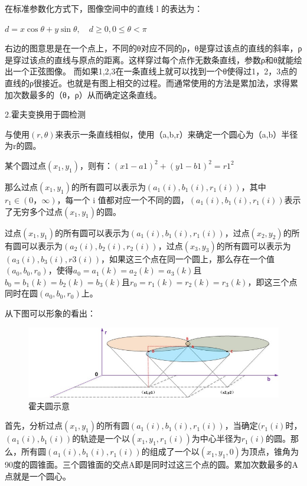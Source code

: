 在标准参数化方式下，图像空间中的直线 l 的表达为：

$d=x \cos \theta+y \sin \theta, \quad d \geqslant 0,0 \leqslant \theta<\pi$

右边的图意思是在一个点上，不同的θ对应不同的ρ，θ是穿过该点的直线的斜率，ρ是穿过该点的直线与原点的距离。这样穿过每个点作无数条直线，参数ρ和θ就能绘出一个正弦图像。 ⽽如果1,2,3在一条直线上就可以找到⼀个θ使得过1，2，3点的直线的ρ很接近。也就是有图上相交的过程。而通常使用的方法是累加法，求得累加次数最多的（θ，ρ）从⽽确定这条直线。

2.霍夫变换用于圆检测

与使用$(r, \theta)$来表示一条直线相似，使用（a,b,r）来确定一个圆心为（a,b）半径为r的圆。

某个圆过点$(x_{1}, y_{1})$，则有：$(x1-a1)^2 + (y1-b1)^2 = r1^2$

那么过点$(x_{1}, y_{1})$的所有圆可以表示为$(a_{1}(i), b_{1}(i), r_{1}(i))$，其中$r_{1} \in (0，\infty)$，每⼀个 i 值都对应⼀个不同的圆，$(a_{1}(i), b_{1}(i), r_{1}(i))$表示了无穷多个过点$(x_{1}, y_{1})$的圆。

过点$(x_{1}, y_{1})$的所有圆可以表示为$(a_{1}(i), b_{1}(i),r_{1}(i))$，过点$(x_{2}, y_{2})$的所有圆可以表示为$(a_{2}(i),b_{2}(i),r_{2}(i))$，过点$(x_{3}, y_{3})$的所有圆可以表示为$(a_{3}(i),b_{3}(i),r3(i))$，如果这三个点在同一个圆上，那么存在一个值$(a_{0},b_{0},r_{0})$，使得$a_{0} = a_{1}(k) = a_{2}(k) = a_{3}(k)$且$b_{0} = b_{1}(k) = b_{2}(k) = b_{3}(k)$且$r_{0} = r_{1}(k) = r_{2}(k) = r_{3}(k)$，即这三个点同时在圆$(a_{0}, b_{0}, r_{0})$上。

从下图可以形象的看出：

\begin{figure}[ht]
  \centering
  \includegraphics[width=0.8\linewidth]{./Figure/Hough_Circle.png}
  \caption{霍夫圆示意}\label{Fig:img2}
\end{figure}

⾸先，分析过点$(x_{1}, y_{1})$的所有圆$(a_{1}(i), b_{1}(i),r_{1}(i))$，当确定$(r_{1}(i)$时，$(a_{1}(i), b_{1}(i))$的轨迹是⼀个以$(x_{1}, y_{1}, r_{1}(i))$为中心半径为$r_{1}(i)$的圆。那么，所有圆$(a_{1}(i), b_{1}(i),r_{1}(i))$的组成了一个以$(x_{1}, y_{1}, 0)$为顶点，锥角为90度的圆锥面。三个圆锥面的交点A即是同时过这三个点的圆。累加次数最多的A点就是一个圆⼼。

